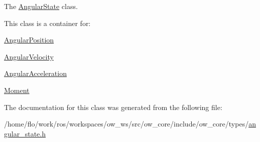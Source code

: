 The \hyperlink{classow__core_1_1AngularState}{Angular\+State} class. 

This class is a container for\+:
\begin{DoxyItemize}
\item \hyperlink{classow__core_1_1AngularPosition}{Angular\+Position}
\item \hyperlink{classow__core_1_1AngularVelocity}{Angular\+Velocity}
\item \hyperlink{classow__core_1_1AngularAcceleration}{Angular\+Acceleration}
\item \hyperlink{classow__core_1_1Moment}{Moment} 
\end{DoxyItemize}

The documentation for this class was generated from the following file\+:\begin{DoxyCompactItemize}
\item 
/home/flo/work/ros/workspaces/ow\+\_\+ws/src/ow\+\_\+core/include/ow\+\_\+core/types/\hyperlink{angular__state_8h}{angular\+\_\+state.\+h}\end{DoxyCompactItemize}
